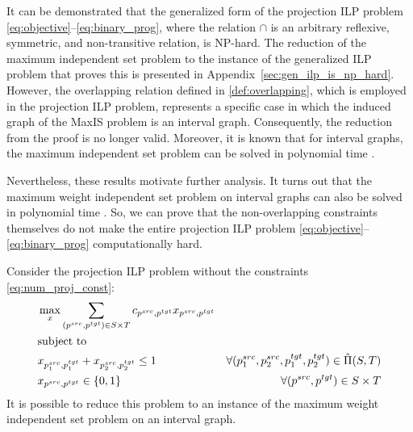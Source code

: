 It can be demonstrated that the generalized form of the projection ILP problem
\eqref{eq:objective}--\eqref{eq:binary_prog}, where the relation \( \cap \) is an
arbitrary reflexive, symmetric, and non-transitive relation, is NP-hard. The
reduction of the maximum independent set problem to the instance of the generalized
ILP problem that proves this is presented in Appendix~\ref{sec:gen_ilp_is_np_hard}.
However, the overlapping relation defined in \ref{def:overlapping}, which is
employed in the projection ILP problem, represents a specific case in which
the induced graph of the MaxIS problem is an interval graph. Consequently, the
reduction from the proof is no longer valid. Moreover, it is known that for interval graphs,
the maximum independent set problem can be solved in polynomial time \cite{bhattacharya2014maximum}.

Nevertheless, these results motivate further analysis. It turns out that the maximum
weight independent set problem on interval graphs can also be solved in polynomial
time \cite{PalB96}. So, we can prove that the non-overlapping constraints themselves
do not make the entire projection ILP problem \eqref{eq:objective}--\eqref{eq:binary_prog}
computationally hard.

Consider the projection ILP problem without the constraints \eqref{eq:num_proj_const}:
\begin{equation} \label{eq:ilp_without_nproj}
  \begin{aligned}
    & \max\limits_x \sum\limits_{(p^{src}, p^{tgt}) \in S \times T} c_{p^{src}, p^{tgt}} x_{p^{src}, p^{tgt}}                                             \\
    & \text{subject to}                                                                                                                                   \\
    & x_{p_1^{src}, p_1^{tgt}} + x_{p_2^{src}, p_2^{tgt}} \leq 1
    & \forall (p_1^{src}, p_2^{src}, p_1^{tgt}, p_2^{tgt}) \in \hat{\Pi}(S, T)                                                                            \\
    & x_{p^{src}, p^{tgt}} \in \{ 0, 1 \}                                                                     & \forall (p^{src}, p^{tgt}) \in S \times T
  \end{aligned}
\end{equation}
It is possible to reduce this problem to an instance of the maximum weight
independent set problem on an interval graph.

